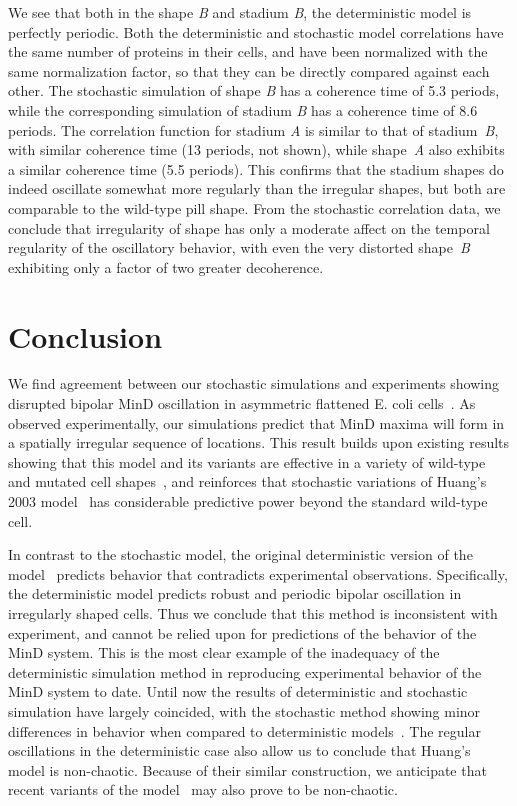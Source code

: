 \documentclass[10pt,letterpaper]{article}
\begin{document}
We see that both in the shape \emph{B} and stadium \emph{B}, the
deterministic model is perfectly periodic.  Both the deterministic and
stochastic model correlations have the same number of proteins in
their cells, and have been normalized with the same normalization
factor, so that they can be directly compared against each other.  The
stochastic simulation of shape \emph{B} has a coherence time of 5.3
periods, while the corresponding simulation of stadium \emph{B} has a
coherence time of 8.6 periods.
%
The correlation function for stadium \emph{A} is similar to that of
stadium~\emph{B}, with similar coherence time (13 periods, not shown),
while shape~\emph{A} also exhibits a similar coherence time (5.5
periods).  This confirms that the stadium shapes do indeed oscillate
somewhat more regularly than the irregular shapes, but both are
comparable to the wild-type pill shape.
%
From the stochastic correlation data, we conclude that irregularity of
shape has only a moderate affect on the temporal regularity of the
oscillatory behavior, with even the very distorted shape~\emph{B}
exhibiting only a factor of two greater decoherence.

\section*{Conclusion}
We find agreement between our stochastic simulations and experiments
showing disrupted bipolar MinD oscillation in asymmetric flattened
E. coli cells~\cite{mannik2012robustness}.  As observed
experimentally, our simulations predict that MinD maxima will form in
a spatially irregular sequence of locations.  This result builds upon
existing results showing that this model and its variants are
effective in a variety of wild-type and mutated cell
shapes~\cite{fange2006noise, varma2008min, kruse2007experimentalist},
and reinforces that stochastic variations of Huang's 2003
model~\cite{fange2006noise, kerr2006division} has considerable
predictive power beyond the standard wild-type cell.

In contrast to the stochastic model, the original deterministic
version of the model~\cite{huang2003dynamic} predicts behavior that
contradicts experimental observations.  Specifically, the
deterministic model predicts robust and periodic bipolar oscillation
in irregularly shaped cells.  Thus we conclude that this method is
inconsistent with experiment, and cannot be relied upon for
predictions of the behavior of the MinD system.  This is the most
clear example of the inadequacy of the deterministic simulation method
in reproducing experimental behavior of the MinD system to date.
Until now the results of deterministic and stochastic simulation have
largely coincided, with the stochastic method showing minor
differences in behavior when compared to deterministic
models~\cite{kerr2006division, fange2006noise, huang2004min,
  kruse2007experimentalist}.  The regular oscillations in the
deterministic case also allow us to conclude that Huang's model is
non-chaotic.  Because of their similar construction, we anticipate
that recent variants of the model~\cite{bonny2013membrane,
  fange2006noise, halatek2012highly} may also prove to be
non-chaotic.
\end{document}
